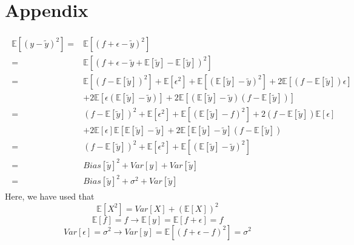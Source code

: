 \onecolumn
\setcounter{equation}{0}
\renewcommand\theequation{A.\arabic{equation}}
\section*{Appendix}
\label{sec:appendix}

\begin{align}\label{eq:derivation_bias_variance}
\begin{split}
	\mathds{E}[(y-\tilde{y})^2] =& \mathds{E}[(f+\epsilon - \tilde{y})^2] \\
	=& \mathds{E}[\left(f+\epsilon - \tilde{y} + \mathds{E}[\tilde{y}] - \mathds{E}[\tilde{y}]\right)^2] \\
	=& \mathds{E}[(f-\mathds{E}[\tilde{y}])^2] + \mathds{E}[\epsilon^2] + \mathds{E}[(\mathds{E}[\tilde{y}]-\tilde{y})^2] + 2\mathds{E}[(f-\mathds{E}[\tilde{y}])\epsilon] \\
	&+ 2\mathds{E}[\epsilon(\mathds{E}[\tilde{y}]-\tilde{y})] + 2\mathds{E}[(\mathds{E}[\tilde{y}]-\tilde{y})(f-\mathds{E}[\tilde{y}])] \\
	=& (f-\mathds{E}[\tilde{y}])^2 + \mathds{E}[\epsilon^2] + \mathds{E}[(\mathds{E}[\tilde{y}]-f)^2] + 2(f-\mathds{E}[\tilde{y}])\mathds{E}[\epsilon] \\
	&+ 2\mathds{E}[\epsilon]\mathds{E}[\mathds{E}[\tilde{y}]-\tilde{y}] + 2\mathds{E}[\mathds{E}[\tilde{y}]-\tilde{y}](f-\mathds{E}[\tilde{y}]) \\
	=& (f-\mathds{E}[\tilde{y}])^2 + \mathds{E}[\epsilon^2] + \mathds{E}[(\mathds{E}[\tilde{y}]-\tilde{y})^2] \\
	=& Bias[\tilde{y}]^2 + Var[y] + Var[\tilde{y}] \\
	=& Bias[\tilde{y}]^2 + \sigma^2 + Var[\tilde{y}]
\end{split}
\end{align}
Here, we have used that
\begin{equation*}
	\mathds{E}[X^2] = Var[X] + \left(\mathds{E}[X]\right)^2
\end{equation*}
\begin{equation*}
	\mathds{E}[f]=f \rightarrow \mathds{E}[y]=\mathds{E}[f+\epsilon] = f
\end{equation*}
\begin{equation*}
	Var[\epsilon] = \sigma^2 \rightarrow Var[y] = \mathds{E}[(f+\epsilon-f)^2] = \sigma^2
\end{equation*}

